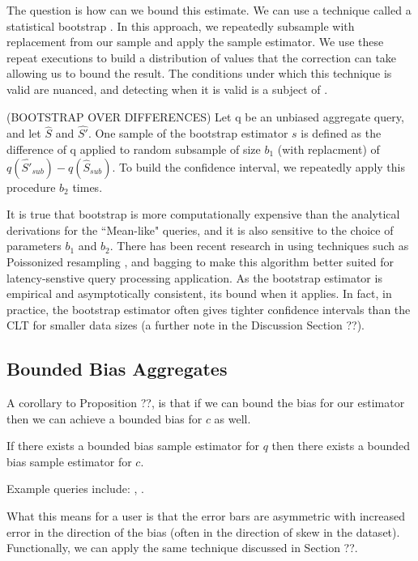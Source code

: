 The question is how can we bound this estimate.
We can use a technique called a statistical bootstrap \cite{AgarwalMPMMS13}.
In this approach, we repeatedly subsample with replacement from our sample and apply the sample estimator.
We use these repeat executions to build a distribution of values that the correction can take allowing us to bound the result.
The conditions under which this technique is valid are nuanced, and detecting when it is valid is a subject of \cite{agarwalknowing}.

\begin{proposition} (BOOTSTRAP OVER DIFFERENCES) Let q be an unbiased aggregate query, and let $\hat{S}$ and $\hat{S'}$.
One sample of the bootstrap estimator $s$ is defined as the difference of q applied to random subsample of size $b_1$ (with replacment) of $q(\hat{S'}_{sub}) - q(\hat{S}_{sub})$. 
To build the confidence interval, we repeatedly apply this procedure $b_2$ times.
\end{proposition}

It is true that bootstrap is more computationally expensive than the analytical derivations for the ``Mean-like" queries, and it is also sensitive to the choice of parameters $b_1$ and $b_2$.
There has been recent research in using techniques such as Poissonized resampling \cite{agarwalknowing}, and bagging \cite{DBLP:conf/kdd/KleinerTASJ13} to make this algorithm better suited for latency-senstive query processing application.
As the bootstrap estimator is empirical and asymptotically consistent, its bound when it applies. 
In fact, in practice, the bootstrap estimator often gives tighter confidence intervals than the CLT for smaller data sizes (a further note in the Discussion Section ??).

\subsection{Bounded Bias Aggregates}
A corollary to Proposition ??, is that if we can bound the bias for our estimator then we can achieve a bounded bias for $c$ as well.
\begin{corollary}
If there exists a bounded bias sample estimator for $q$ then there exists a bounded bias sample estimator for $c$.
\end{corollary}
Example queries include: \medfunc, \percfunc.

What this means for a user is that the error bars are asymmetric with increased error in the direction of the bias (often in the direction of skew in the dataset).
Functionally, we can apply the same technique discussed in Section ??. 

